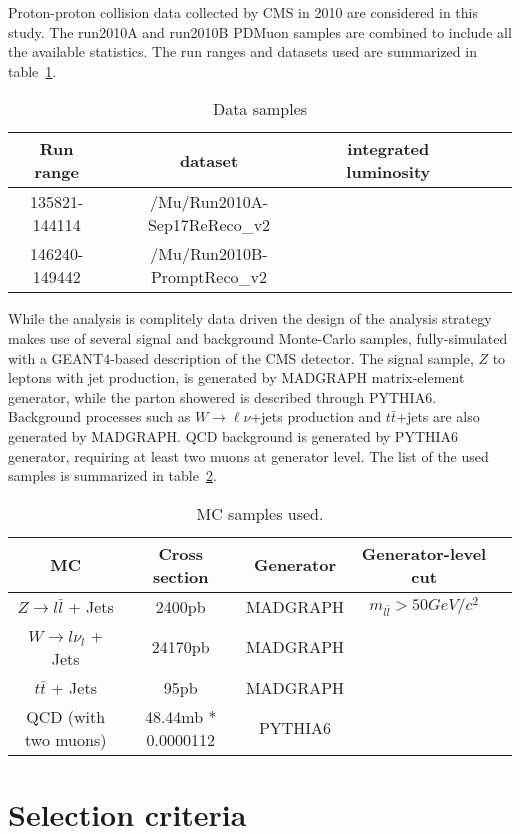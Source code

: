 \documentclass{cmspaper}
\begin{document}
Proton-proton collision data collected by CMS in 2010 are considered
in this study. The run2010A and run2010B PDMuon samples are combined
to include all the available statistics. The run ranges and datasets
used are summarized in table~\ref{Table_DataSamples}.

\begin{table}[htbp]
   \caption{Data samples}
   \centering
   \begin{tabular}{|c|c|c|c|c|c|}
   \hline
   Run range & dataset & integrated luminosity \\\hline
   135821-144114 & /Mu/Run2010A-Sep17ReReco\_v2 &  \\\hline
   146240-149442 & /Mu/Run2010B-PromptReco\_v2 &  \\\hline
   \end{tabular}
   \label{Table_DataSamples}
\end{table}

While the analysis is complitely data driven the design of the
analysis strategy makes use of several signal and background
Monte-Carlo samples, fully-simulated with a GEANT4-based description
of the CMS detector. The signal sample, $Z$ to leptons with jet
production, is generated by MADGRAPH matrix-element generator, while
the parton showered is described through PYTHIA6.  Background
processes such as $W\to \ell \nu$+jets production and $t \bar t$+jets
are also generated by MADGRAPH.  QCD background is generated by
PYTHIA6 generator, requiring at least two muons at generator level.
The list of the used samples is summarized in
table~\ref{Table_MCSamples}.

\begin{table}[htbp]
   \caption{MC samples used.}
   \centering
   \begin{tabular}{|c|c|c|c|c|}
   \hline
   MC & Cross section & Generator & Generator-level cut \\\hline
   $Z \rightarrow l\bar{l}$ + Jets & 2400pb & MADGRAPH & $m_{l\bar{l}} > 50 GeV/c^2$ \\\hline
   $W \rightarrow l\nu_l$ + Jets & 24170pb & MADGRAPH &  \\\hline
   $t\bar{t}$ + Jets & 95pb & MADGRAPH &  \\\hline
   QCD (with two muons) & 48.44mb * 0.0000112 & PYTHIA6 &  \\\hline
   \end{tabular}
   \label{Table_MCSamples}
\end{table}

\section{Selection criteria}
\end{document}
